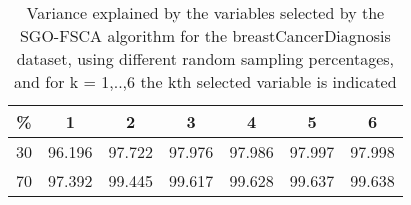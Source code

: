 \begin{table}
	\begin{center}
		\begin{tabular}{c c c c c c c}
			\% & 1 & 2 & 3 & 4 & 5 & 6 \\
			\hline
			30 & 96.196 & 97.722 & 97.976 & 97.986 & 97.997 & 97.998 \\
			70 & 97.392 & 99.445 & 99.617 & 99.628 & 99.637 & 99.638 \\
		\end{tabular}
	\end{center}
	\caption{Variance explained by the variables selected by the SGO-FSCA algorithm for the breastCancerDiagnosis dataset, using different random sampling percentages, and for k = 1,..,6 the kth selected variable is indicated}
\end{table}